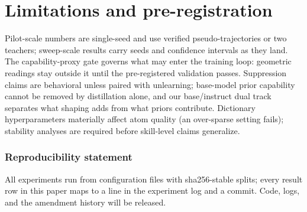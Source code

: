 \section{Limitations and pre-registration}\label{sec:limitations}
Pilot-scale numbers are single-seed and use verified pseudo-trajectories or
two teachers; sweep-scale results carry seeds and confidence intervals as
they land. The capability-proxy gate governs what may enter the training
loop: geometric readings stay outside it until the pre-registered validation
passes. Suppression claims are behavioral unless paired with unlearning;
base-model prior capability cannot be removed by distillation alone, and our
base/instruct dual track separates what shaping adds from what priors
contribute. Dictionary hyperparameters materially affect atom quality (an
over-sparse setting fails); stability analyses are required before
skill-level claims generalize. 

\subsubsection*{Reproducibility statement}
All experiments run from configuration files with sha256-stable splits; every
result row in this paper maps to a line in the experiment log and a commit.
Code, logs, and the amendment history will be released.
